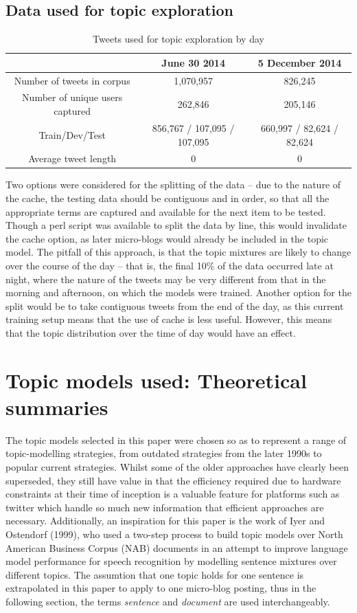 \documentclass{article}
\begin{document}
\subsection{Data used for topic exploration}
\begin{table}
	\begin{tabular}{|c|c|c|}
	\hline
	& June 30 2014 & 5 December 2014 \\
	\hline
	Number of tweets in corpus & 1,070,957 & 826,245 \\
	Number of unique users captured & 262,846 & 205,146 \\ %
	Train/Dev/Test & 856,767 / 107,095 / 107,095 & 660,997 / 82,624 / 82,624 \\
	Average tweet length & 0 & 0\\
	\hline
	\end{tabular}
\caption{Tweets used for topic exploration by day}
\end{table} 

Two options were considered for the splitting of the data – due to the nature of the cache, the testing data should be contiguous and in order, so that all the appropriate terms are captured and available for the next item to be tested. Though a perl script was available to split the data by line, this would invalidate the cache option, as later micro-blogs would already be included in the topic model.
The pitfall of this approach, is that the topic mixtures are likely to change over the course of the day – that is, the final 10\% of the data occurred late at night, where the nature of the tweets may be very different from that in the morning and afternoon, on which the models were trained.  %
Another option for the split would be to take contiguous tweets from the end of the day, as this current training setup means that the use of cache is less useful. However, this means that the topic distribution over the time of day would have an effect.


\section {Topic models used: Theoretical summaries}
The topic models selected in this paper were chosen so as to represent a range of topic-modelling strategies, from outdated strategies from the later 1990s to popular current strategies. Whilst some of the older approaches have clearly been superseded, they still have value in that the efficiency required due to hardware constraints at their time of inception is a valuable feature for platforms such as twitter which handle so much new information that efficient approaches are necessary. 
Additionally, an inspiration for this paper is the work of Iyer and Ostendorf (1999), who used a two-step process to build topic models over North American Business Corpus (NAB) documents in an attempt to improve language model performance for speech recognition  by modelling sentence mixtures over different topics. The assumtion that one topic holds for one sentence is extrapolated in this paper to apply to one micro-blog posting, thus in the following section, the terms \textit{sentence} and \textit{document} are used interchangeably.
\end{document}
